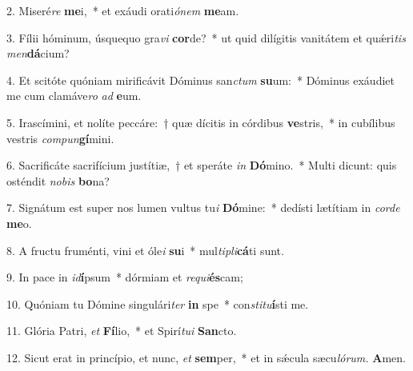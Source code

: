 \item 2. Miseré\textit{re }\textbf{me}i,~* et exáudi orati\textit{ónem} \textbf{me}am.
\item 3. Fílii hóminum, úsquequo gra\textit{vi }\textbf{cor}de?~* ut quid dilígitis vanitátem et quǽri\textit{tis} \textit{men}\textbf{dá}cium?
\item 4. Et scitóte quóniam mirificávit Dóminus san\textit{ctum} \textbf{su}um:~* Dóminus exáudiet me cum clamáve\textit{ro} \textit{ad} \textbf{e}um.
\item 5. Irascímini, et nolíte peccáre:~† quæ dícitis in córdibus \textbf{ve}stris,~* in cubílibus vestris \textit{compun}\textbf{gí}mini.
\item 6. Sacrificáte sacrifícium justítiæ,~† et speráte \textit{in} \textbf{Dó}mino.~* Multi dicunt: quis osténdit \textit{nobis} \textbf{bo}na?
\item 7. Signátum est super nos lumen vultus tu\textit{i} \textbf{Dó}mine:~* dedísti lætítiam in \textit{corde} \textbf{me}o.
\item 8. A fructu fruménti, vini et óle\textit{i} \textbf{su}i~* mul\textit{tipli}\textbf{cá}ti sunt.
\item 9. In pace in \textit{id}\textbf{í}psum~* dórmiam et \textit{requi}\textbf{és}cam;
\item 10. Quóniam tu Dómine singulári\textit{ter} \textbf{in} spe~* con\textit{stitu}\textbf{í}sti me.
\item 11. Glória Patri, \textit{et} \textbf{Fí}lio,~* et Spirí\hspace{0.03em}\textit{tui} \textbf{San}cto.
\item 12. Sicut erat in princípio, et nunc, \textit{et} \textbf{sem}per,~* et in sǽcula sæcu\hspace{0.03em}\textit{lórum.} \textbf{A}men.